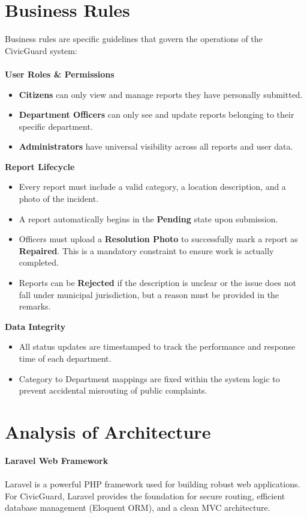 \section{Business Rules}
Business rules are specific guidelines that govern the operations of the CivicGuard system:
\\\\
\textbf{User Roles & Permissions}
\begin{itemize}
    \item \textbf{Citizens} can only view and manage reports they have personally submitted.
    \item \textbf{Department Officers} can only see and update reports belonging to their specific department.
    \item \textbf{Administrators} have universal visibility across all reports and user data.
\end{itemize}

\textbf{Report Lifecycle}
\begin{itemize}
    \item Every report must include a valid category, a location description, and a photo of the incident.
    \item A report automatically begins in the \textbf{Pending} state upon submission.
    \item Officers must upload a \textbf{Resolution Photo} to successfully mark a report as \textbf{Repaired}. This is a mandatory constraint to ensure work is actually completed.
    \item Reports can be \textbf{Rejected} if the description is unclear or the issue does not fall under municipal jurisdiction, but a reason must be provided in the remarks.
\end{itemize}

\textbf{Data Integrity}
\begin{itemize}
    \item All status updates are timestamped to track the performance and response time of each department.
    \item Category to Department mappings are fixed within the system logic to prevent accidental misrouting of public complaints.
\end{itemize}

\newpage
\section{Analysis of Architecture}
{\large \textbf{Laravel Web Framework}}\\\\
Laravel is a powerful PHP framework used for building robust web applications. For CivicGuard, Laravel provides the foundation for secure routing, efficient database management (Eloquent ORM), and a clean MVC architecture.


